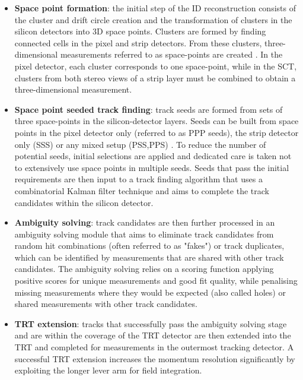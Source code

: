 \documentclass[a4paper, oneside]{book}
\begin{document}
		\begin{itemize}
			\item \textbf{Space point formation}: the initial step of the ID reconstruction consists of the cluster and drift circle creation and the transformation of clusters in the silicon detectors into 3D space points. Clusters are formed by finding connected cells in
			the pixel and strip detectors. From these clusters, three-dimensional measurements referred to as space-points are created \cite{Track reco}. In the pixel detector, each cluster corresponds to one space-point, while in the SCT, clusters from both stereo views of a strip layer must be combined to obtain a three-dimensional measurement. 
			
			\item \textbf{Space point seeded track finding}: track seeds are formed from sets of three space-points in the silicon-detector layers. Seeds can be built from space points in the pixel detector only (referred to as PPP seeds), the strip detector only (SSS) or any mixed setup (PSS,PPS) \cite{ID reco alg}. To reduce the number of potential seeds, initial selections are applied and dedicated care is taken not to
			extensively use space points in multiple seeds. Seeds that pass the initial requirements are then input to a track finding algorithm that uses a combinatorial Kalman filter technique \cite{Kalman} and aims to complete the track candidates within the silicon detector.
			
			\item \textbf{Ambiguity solving}: track candidates are then further processed in an ambiguity solving
			module that aims to eliminate track candidates from random hit combinations (often
			referred to as "fakes") or track duplicates, which can be identified by measurements that are shared with other track candidates. The ambiguity solving relies on a scoring function applying positive scores for unique measurements and good fit quality, while penalising missing measurements where they would be expected (also called holes) or shared measurements with other track candidates.
			
			\item \textbf{TRT extension}: tracks that successfully pass the ambiguity solving stage and are within the coverage of the TRT detector are then extended into the TRT and completed for measurements in the outermost tracking detector. A successful TRT extension increases the
			momentum resolution significantly by exploiting the longer lever arm for field integration.
		\end{itemize}
		
\end{document}
